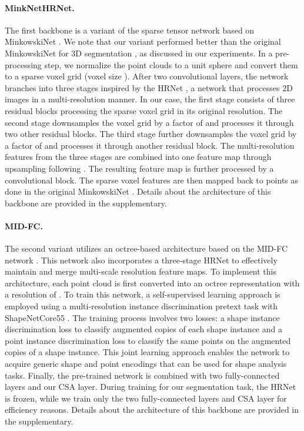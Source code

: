 \documentclass{egpubl}
\begin{document}
\paragraph*{MinkNetHRNet.} The first backbone is a 
variant of the sparse tensor network based on MinkowskiNet \cite{Choy:2019}. 
We note that our variant performed better than the original MinkowskiNet  for 3D segmentation \cite{Choy:2019}, as discussed in our 
experiments. In a pre-processing step, we normalize the point clouds to a unit sphere and convert them to a sparse voxel grid (voxel size ). After two convolutional layers, the network branches into three stages inspired by the HRNet \cite{HRNet:2019}, a network that processes 2D images in a multi-resolution manner. In our case, the first stage consists of three residual blocks processing the sparse voxel grid in its original resolution. The second stage downsamples the voxel grid by a factor of  and processes it through two other residual blocks. The third stage further downsamples the voxel grid by a factor of  and processes it through another residual block. The multi-resolution features from the three stages are combined into one feature map through upsampling following \cite{HRNet:2019}. 
The resulting feature map is further processed by a  convolutional block. The sparse voxel features are then mapped back to points as done in the original MinkowskiNet \cite{Choy:2019}. Details about the architecture of this backbone are provided in the supplementary. 

\vspace{-1.75mm}
\paragraph*{MID-FC.} The second variant utilizes an octree-based architecture based on the MID-FC 
network \cite{Wang:2021}. This network also incorporates a three-stage HRNet   \cite{HRNet:2019} to effectively maintain and merge multi-scale resolution feature maps. To implement this architecture, 
each point cloud is first converted into an octree representation with a resolution of . To train 
this network, a self-supervised learning approach is employed using a multi-resolution instance 
discrimination pretext task with ShapeNetCore55 \cite{Wang:2021}. The training process involves 
two losses: a shape instance discrimination loss to classify augmented copies of each shape instance 
and a point instance discrimination loss to classify the same points on the augmented copies of a shape 
instance. This joint learning approach enables the network to acquire generic shape and point encodings 
that can be used for shape analysis tasks. Finally, the pre-trained network is combined with 
two fully-connected layers and our CSA layer. During training for our segmentation task, the HRNet is frozen, while we train only the two fully-connected layers and CSA layer for efficiency reasons. Details about the architecture of this backbone are provided in the supplementary. 
\end{document}
